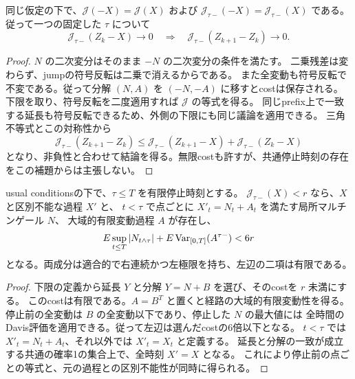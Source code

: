 \begin{lemma}
同じ仮定の下で、$\mathcal J(-X)=\mathcal J(X)$ および
$\mathcal J_{\tau-}(-X)=\mathcal J_{\tau-}(X)$ である。
従って一つの固定した $\tau$ について
\[
 \mathcal J_{\tau-}(Z_k-X)\longrightarrow0
 \quad\Longrightarrow\quad
 \mathcal J_{\tau-}(Z_{k+1}-Z_k)\longrightarrow0.
\]
\end{lemma}
\begin{proof}
$N$ の二次変分はそのまま $-N$ の二次変分の条件を満たす。
二乗残差は変わらず、jumpの符号反転は二乗で消えるからである。
また全変動も符号反転で不変である。従って分解 $(N,A)$ を $(-N,-A)$ に移すとcostは保存される。
下限を取り、符号反転を二度適用すれば $\mathcal J$ の等式を得る。
同じprefix上で一致する延長も符号反転できるため、外側の下限にも同じ議論を適用できる。
三角不等式とこの対称性から
\[
 \mathcal J_{\tau-}(Z_{k+1}-Z_k)
 \le\mathcal J_{\tau-}(Z_{k+1}-X)+\mathcal J_{\tau-}(Z_k-X)
\]
となり、非負性と合わせて結論を得る。無限costも許すが、共通停止時刻の存在をこの補題からは主張しない。
\end{proof}

\begin{lemma}[有限costからの局所成分の構成]
usual conditionsの下で、$\tau\le T$ を有限停止時刻とする。
$\mathcal J_{\tau-}(X)<r$ なら、$X$ と区別不能な過程 $X'$ と、
$t<\tau$ で点ごとに $X'_t=N_t+A_t$ を満たす局所マルチンゲール $N$、
大域的有限変動過程 $A$ が存在し、
\[
 E\sup_{t\le T}|N_{t\wedge\tau}|
 +E\operatorname{Var}_{[0,T]}(A^{\tau-})<6r
\]
となる。両成分は適合的で右連続かつ左極限を持ち、左辺の二項は有限である。
\end{lemma}
\begin{proof}
下限の定義から延長 $Y$ と分解 $Y=N+B$ を選び、そのcostを $r$ 未満にする。
このcostは有限である。$A=B^T$ と置くと経路の大域的有限変動性を得る。
停止前の全変動は $B$ の全変動以下であり、停止した $N$ の最大値には
全時間のDavis評価を適用できる。従って左辺は選んだcostの6倍以下となる。
$t<\tau$ では $X'_t=N_t+A_t$、それ以外では $X'_t=X_t$ と定義する。
延長と分解の一致が成立する共通の確率1の集合上で、全時刻 $X'=X$ となる。
これにより停止前の点ごとの等式と、元の過程との区別不能性が同時に得られる。
\end{proof}

